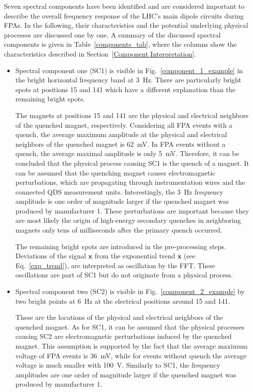 \documentclass[lettersize,journal]{IEEEtran}
\begin{document}
Seven spectral components have been identified and are considered important to describe the overall frequency response of the LHC's main dipole circuits during FPAs. 
In the following, their characteristics and the potential underlying physical processes are discussed one by one. A summary of the discussed spectral components is given in Table~\ref{components_tab}, where the columns show the characteristics described in Section~\ref{Component Interpretation}.

\begin{itemize}
    \item Spectral component one (SC1) is visible in Fig.~\ref{component_1_example} in the bright horizontal frequency band at 3~Hz.
    There are particularly bright spots at positions 15 and 141 which have a different explanation than the remaining bright spots.
    
    The magnets at positions 15 and 141 are the physical and electrical neighbors of the quenched magnet, respectively.
    Considering all FPA events with a quench, the average maximum amplitude at the physical and electrical neighbors of the quenched magnet is 62~mV.
    In FPA events without a quench, the average maximal amplitude is only 5~mV.
    Therefore, it can be concluded that the physical process causing SC1 is the quench of a magnet.
    It can be assumed that the quenching magnet causes electromagnetic perturbations, which are propagating through instrumentation wires and the connected QDS measurement units.   
    Interestingly, the 3~Hz frequency amplitude is one order of magnitude larger if the quenched magnet was produced by manufacturer 1.
    These perturbations are important because they are most likely the origin of high-energy secondary quenches in neighboring magnets only tens of milliseconds after the primary quench occurred.
    
    The remaining bright spots are introduced in the pre-processing steps.
    Deviations of the signal $\mathbf{x}$ from the exponential trend $\bar{\mathbf{x}}$ (see Eq.~\ref{exp_trend}), are interpreted as oscillation by the FFT. 
    These oscillations are part of SC1 but do not originate from a physical process.

    \item Spectral component two (SC2) is visible in Fig.~\ref{component_2_example} by two bright points at 6~Hz at the electrical positions around 15 and 141.

    These are the locations of the physical and electrical neighbors of the quenched magnet.
    As for SC1, it can be assumed that the physical processes causing SC2 are electromagnetic perturbations induced by the quenched magnet.
    This assumption is supported by the fact that the average maximum voltage of FPA events is 36~mV, while for events without quench the average voltage is much smaller with 100~\textmu V.
    Similarly to SC1, the frequency amplitudes are one order of magnitude larger if the quenched magnet was produced by manufacturer 1.
    

\end{itemize}
\end{document}
